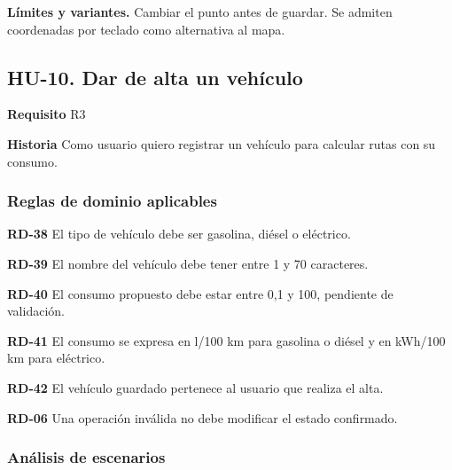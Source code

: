 {\fontsize{9}{11.8}\selectfont\textbf{Límites y variantes.} Cambiar el punto antes de guardar. Se admiten coordenadas por teclado como alternativa al mapa.\par}\vspace{4pt}
\clearpage\subsection*{HU-10. Dar de alta un vehículo}

\textbf{Requisito} R3\par

\textbf{Historia} Como usuario quiero registrar un vehículo para calcular rutas con su consumo.\par

\subsubsection*{Reglas de dominio aplicables}

\textbf{RD-38} El tipo de vehículo debe ser gasolina, diésel o eléctrico.\par

\textbf{RD-39} El nombre del vehículo debe tener entre 1 y 70 caracteres.\par

\textbf{RD-40} El consumo propuesto debe estar entre 0,1 y 100, pendiente de validación.\par

\textbf{RD-41} El consumo se expresa en l/100 km para gasolina o diésel y en kWh/100 km para eléctrico.\par

\textbf{RD-42} El vehículo guardado pertenece al usuario que realiza el alta.\par

\textbf{RD-06} Una operación inválida no debe modificar el estado confirmado.\par

\subsubsection*{Análisis de escenarios}

